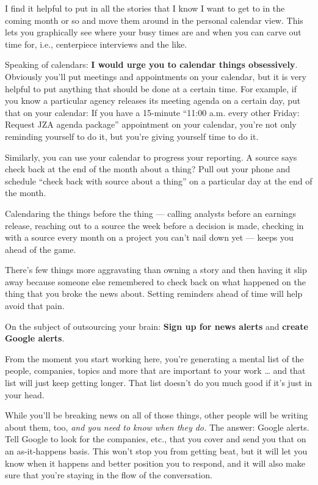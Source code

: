 \documentclass[
  11pt,
  american,
  letterpaperpaper,
  extrafontsizes,onecolumn,openright
  ]{memoir}
\begin{document}
I find it helpful to put in all the stories that I know I want to get to in the coming month or so and move them around in the personal calendar view. This lets you graphically see where your busy times are and when you can carve out time for, i.e., centerpiece interviews and the like.

Speaking of calendars: \textbf{I would urge you to calendar things obsessively}. Obviously you'll put meetings and appointments on your calendar, but it is very helpful to put anything that should be done at a certain time. For example, if you know a particular agency releases its meeting agenda on a certain day, put that on your calendar: If you have a 15-minute \enquote{11:00 a.m. every other Friday: Request JZA agenda package} appointment on your calendar, you're not only reminding yourself to do it, but you're giving yourself time to do it.

Similarly, you can use your calendar to progress your reporting. A source says check back at the end of the month about a thing? Pull out your phone and schedule \enquote{check back with source about a thing} on a particular day at the end of the month.

Calendaring the things before the thing --- calling analysts before an earnings release, reaching out to a source the week before a decision is made, checking in with a source every month on a project you can't nail down yet --- keeps you ahead of the game.

There's few things more aggravating than owning a story and then having it slip away because someone else remembered to check back on what happened on the thing that you broke the news about. Setting reminders ahead of time will help avoid that pain.

On the subject of outsourcing your brain: \textbf{Sign up for news alerts} and \textbf{create Google alerts}.

From the moment you start working here, you're generating a mental list of the people, companies, topics and more that are important to your work \ldots{} and that list will just keep getting longer. That list doesn't do you much good if it's just in your head.

While you'll be breaking news on all of those things, other people will be writing about them, too, \emph{and you need to know when they do.} The answer: Google alerts. Tell Google to look for the companies, etc., that you cover and send you that on an as-it-happens basis. This won't stop you from getting beat, but it will let you know when it happens and better position you to respond, and it will also make sure that you're staying in the flow of the conversation.
\end{document}
